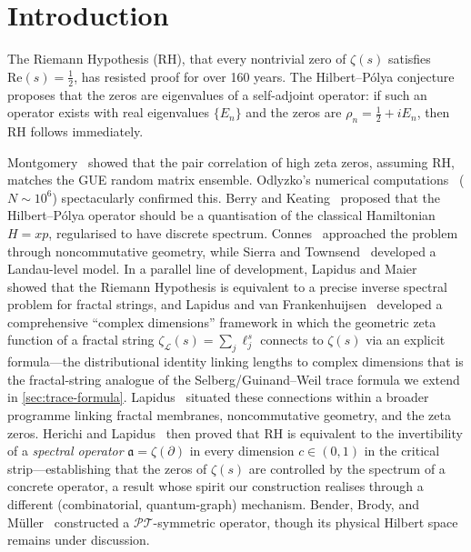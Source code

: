 \documentclass[11pt,a4paper]{article}
\theoremstyle{plain}
\theoremstyle{remark}
\begin{document}
\vspace{4pt}
\noindent
{}
\vspace{4pt}

\section{Introduction}
\label{sec:intro}

The Riemann Hypothesis (RH), that every nontrivial zero of
$\zeta(s)$ satisfies $\mathrm{Re}(s)=\tfrac{1}{2}$, has resisted proof
for over 160 years.  The Hilbert--P\'olya conjecture proposes that the
zeros are eigenvalues of a self-adjoint operator: if such an operator
exists with real eigenvalues $\{E_n\}$ and the zeros are
$\rho_n=\tfrac{1}{2}+iE_n$, then RH follows immediately.

Montgomery~\cite{montgomery1973} showed that the pair correlation of high
zeta zeros, assuming RH, matches the GUE random matrix ensemble.
Odlyzko's numerical computations~\cite{odlyzko1987} ($N\sim 10^6$)
spectacularly confirmed this.  Berry and Keating~\cite{berry-keating1999}
proposed that the Hilbert--P\'olya operator should be a quantisation of
the classical Hamiltonian $H=xp$, regularised to have discrete spectrum.
Connes~\cite{connes1999} approached the problem through noncommutative
geometry, while Sierra and Townsend~\cite{sierra-townsend2008} developed
a Landau-level model.  In a parallel line of development,
Lapidus and Maier~\cite{lapidus-maier1995} showed that the Riemann
Hypothesis is equivalent to a precise inverse spectral problem for
fractal strings, and Lapidus and van
Frankenhuijsen~\cite{lapidus-vf2013} developed a comprehensive
``complex dimensions'' framework in which the geometric zeta function of
a fractal string $\zeta_{\mathcal{L}}(s)=\sum_j \ell_j^s$ connects to
$\zeta(s)$ via an explicit formula---the distributional identity
linking lengths to complex dimensions that is the fractal-string analogue
of the Selberg/Guinand--Weil trace formula we extend in
\cref{sec:trace-formula}.  Lapidus~\cite{lapidus2008} situated these
connections within a broader programme linking fractal membranes,
noncommutative geometry, and the zeta zeros.  Herichi and
Lapidus~\cite{herichi-lapidus2019} then proved
that RH is equivalent to the invertibility of a
\emph{spectral operator} $\mathfrak{a}=\zeta(\partial)$ in every
dimension $c\in(0,1)$ in the critical strip---establishing that the
zeros of $\zeta(s)$ are controlled by the spectrum of a concrete
operator, a result whose spirit our construction realises through
a different (combinatorial, quantum-graph) mechanism.
Bender, Brody, and
M\"uller~\cite{bender-brody-muller2017} constructed a
$\mathcal{PT}$-symmetric operator, though its physical Hilbert space
remains under discussion.
\end{document}
